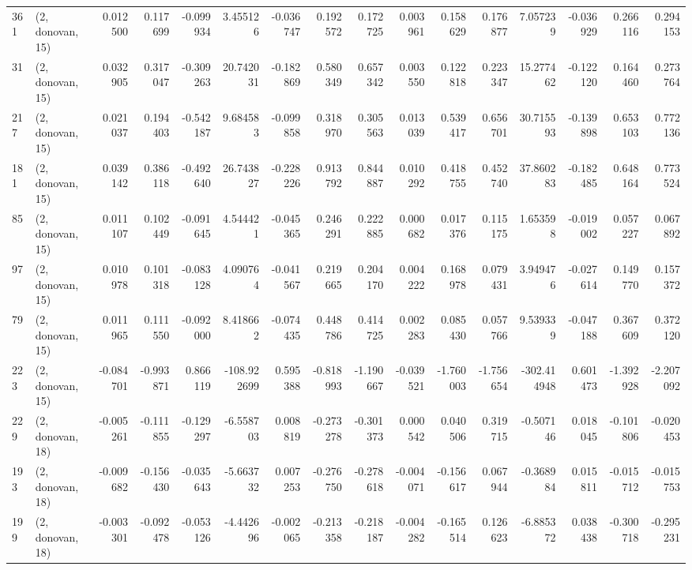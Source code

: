\begin{tabular}{llrrrrrrrrrrrrrr}
361 &  (2, donovan, 15) &   0.012500 &  0.117699 & -0.099934 &    3.455126 & -0.036747 &   0.192572 &  0.172725 &  0.003961 &  0.158629 &  0.176877 &     7.057239 & -0.036929 &  0.266116 &  0.294153 \\
31  &  (2, donovan, 15) &   0.032905 &  0.317047 & -0.309263 &   20.742031 & -0.182869 &   0.580349 &  0.657342 &  0.003550 &  0.122818 &  0.223347 &    15.277462 & -0.122120 &  0.164460 &  0.273764 \\
217 &  (2, donovan, 15) &   0.021037 &  0.194403 & -0.542187 &    9.684583 & -0.099858 &   0.318970 &  0.305563 &  0.013039 &  0.539417 &  0.656701 &    30.715593 & -0.139898 &  0.653103 &  0.772136 \\
181 &  (2, donovan, 15) &   0.039142 &  0.386118 & -0.492640 &   26.743827 & -0.228226 &   0.913792 &  0.844887 &  0.010292 &  0.418755 &  0.452740 &    37.860283 & -0.182485 &  0.648164 &  0.773524 \\
85  &  (2, donovan, 15) &   0.011107 &  0.102449 & -0.091645 &    4.544421 & -0.045365 &   0.246291 &  0.222885 &  0.000682 &  0.017376 &  0.115175 &     1.653598 & -0.019002 &  0.057227 &  0.067892 \\
97  &  (2, donovan, 15) &   0.010978 &  0.101318 & -0.083128 &    4.090764 & -0.041567 &   0.219665 &  0.204170 &  0.004222 &  0.168978 &  0.079431 &     3.949476 & -0.027614 &  0.149770 &  0.157372 \\
79  &  (2, donovan, 15) &   0.011965 &  0.111550 & -0.092000 &    8.418662 & -0.074435 &   0.448786 &  0.414725 &  0.002283 &  0.085430 &  0.057766 &     9.539339 & -0.047188 &  0.367609 &  0.372120 \\
223 &  (2, donovan, 15) &  -0.084701 & -0.993871 &  0.866119 & -108.922699 &  0.595388 &  -0.818993 & -1.190667 & -0.039521 & -1.760003 & -1.756654 &  -302.414948 &  0.601473 & -1.392928 & -2.207092 \\
229 &  (2, donovan, 18) &  -0.005261 & -0.111855 & -0.129297 &   -6.558703 &  0.008819 &  -0.273278 & -0.301373 &  0.000542 &  0.040506 &  0.319715 &    -0.507146 &  0.018045 & -0.101806 & -0.020453 \\
193 &  (2, donovan, 18) &  -0.009682 & -0.156430 & -0.035643 &   -5.663732 &  0.007253 &  -0.276750 & -0.278618 & -0.004071 & -0.156617 &  0.067944 &    -0.368984 &  0.015811 & -0.015712 & -0.015753 \\
199 &  (2, donovan, 18) &  -0.003301 & -0.092478 & -0.053126 &   -4.442696 & -0.002065 &  -0.213358 & -0.218187 & -0.004282 & -0.165514 &  0.126623 &    -6.885372 &  0.038438 & -0.300718 & -0.295231 \\

\end{tabular}
